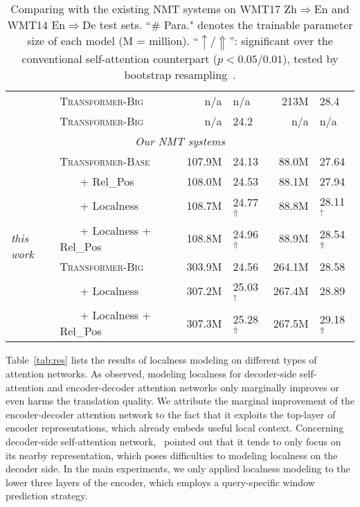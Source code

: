 \documentclass[11pt,a4paper]{article}
\begin{document}
\begin{table*}[t]
\begin{tabular}{l|l||rl|rl}
    &  \textsc{Transformer-Big}               &  n/a  &  n/a  &  213M &  28.4\\ 
    \hdashline
    \cite{hassan2018achieving}  &   \textsc{Transformer-Big}  &  n/a  &  24.2  &  n/a  & n/a\\
    \hline\hline
    \multicolumn{6}{c}{{\em Our NMT systems}}   \\ \hline
    \multirow{7}{*}{\em this work}  &   \textsc{Transformer-Base}  &    107.9M  & 24.13  &  88.0M  &   27.64\\
    &   ~~~ + Rel\_Pos \cite{shaw2018self}  & 108.0M  &   24.53 &  88.1M   &   27.94 \\  &   ~~~ + Localness                     & 108.7M  &   24.77$^\Uparrow$ &  88.8M   &   28.11$^\uparrow$ \\ &   ~~~ + Localness + Rel\_Pos          & 108.8M  &   24.96$^\Uparrow$ &  88.9M   &   28.54$^\Uparrow$ \\ \cline{2-6}
    &   \textsc{Transformer-Big}	                & 303.9M  &   24.56 &  264.1M &  28.58   \\ &   ~~~ + Localness                     & 307.2M  &  25.03$^\uparrow$    & 267.4M  & 28.89 \\ &   ~~~ + Localness + Rel\_Pos          & 307.3M  &  25.28$^\Uparrow$  & 267.5M & 29.18$^\Uparrow$ \\  \end{tabular}
  \caption{Comparing with the existing NMT systems on WMT17 Zh$\Rightarrow$En and WMT14 En$\Rightarrow$De test sets. ``\# Para." denotes the trainable parameter size of each model (M = million).  ``$\uparrow/\Uparrow$'': significant over the conventional self-attention counterpart ($p < 0.05/0.01$), tested by bootstrap resampling~\cite{Koehn2004Statistical}.} 
\label{tab:exist}
\end{table*}

Table~\ref{tab:res} lists the results of localness modeling on different types of attention networks. 
As observed, modeling localness for decoder-side self-attention and encoder-decoder attention networks only marginally improves or even harms the translation quality.
We attribute the marginal improvement of the encoder-decoder attention network to the fact that it exploits the top-layer of encoder representations, which already embeds useful local context.
Concerning decoder-side self-attention network,~ pointed out that it tends to only focus on its nearby representation, which poses difficulties to modeling localness on the decoder side.
In the main experiments, we only applied localness modeling to the lower three layers of the encoder, which employs a query-specific window prediction strategy.
\end{document}

